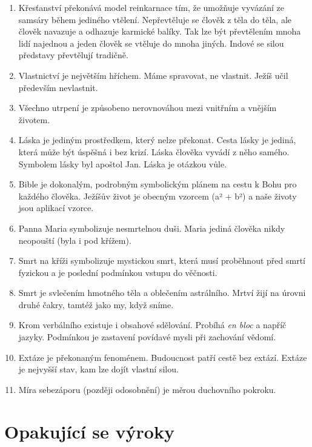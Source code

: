 \begin{enumerate}
{    Apoštolové symbolizují lidské vlastnosti.
  }
  \item{
    Křesťanství překonává model reinkarnace tím, že umožňuje vyvázání ze samsáry během jediného vtělení.
    Nepřevtěluje se člověk z těla do těla, ale člověk navazuje a odhazuje karmické balíky.
    Tak lze být převtělením mnoha lidí najednou a jeden člověk se vtěluje do mnoha jiných.
    Indové se silou představy převtělují tradičně.
  }
  \item{
    Vlastnictví je největším hříchem.
    Máme spravovat, ne vlastnit.
    Ježíš učil především nevlastnit.
  }
  \item{
    Všechno utrpení je způsobeno nerovnováhou mezi vnitřním a vnějším životem.
  }
  \item{
    Láska je jediným prostředkem, který nelze překonat.
    Cesta lásky je jediná, která může být úspěšná i bez krizí.
    Láska člověka vyvádí z něho samého.
    Symbolem lásky byl apoštol Jan.
    Láska je otázkou vůle.
  }
  \item{
    Bible je dokonalým, podrobným symbolickým plánem na cestu k Bohu pro každého člověka.
    Ježíšův život je obecným vzorcem (a² + b²) a naše životy jsou aplikací vzorce.
  }
  \item{
    Panna Maria symbolizuje nesmrtelnou duši.
    Maria jediná člověka nikdy neopouští (byla i pod křížem).
  }
  \item{
    Smrt na kříži symbolizuje mystickou smrt, která musí proběhnout před smrtí fyzickou a je poslední podmínkou vstupu do věčnosti.
  }
  \item{
    Smrt je svlečením hmotného těla a oblečením astrálního.
    Mrtví žijí na úrovni druhé čakry, tamtéž jako my, když sníme.
  }
  \item{
    Krom verbálního existuje i obsahové sdělování.
    Probíhá \textit{en bloc} a napříč jazyky.
    Podmínkou je zastavení povídavé mysli při zachování vědomí.
  }
  \item{
    Extáze je překonaným fenoménem.
    Budoucnost patří cestě bez extází.
    Extáze je nejvyšší stav, kam lze dojít vlastní silou.
  }
  \item{
    Míra sebezáporu (později odosobnění) je měrou duchovního pokroku.
  }
\end{enumerate}

\section{Opakující se výroky}

